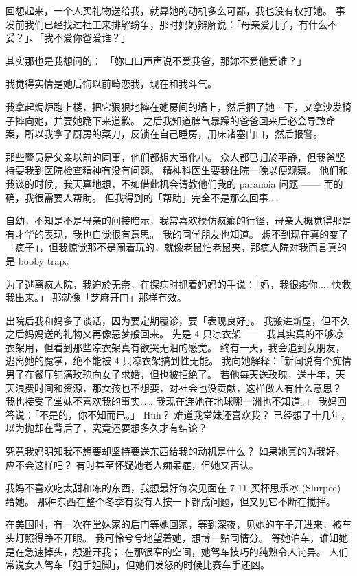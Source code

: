 \documentclass[12pt]{report}
\begin{document}
回想起来，一个人买礼物送给我，就算她的动机多么可鄙，我也没有权打她。 事发前我们已经找过社工来排解纷争，那时妈妈辩解说：「母亲爱儿子，有什么不妥？」、「我不爱你爸爱谁？」

其实那也是我想问的： 「妳口口声声说不爱我爸，那妳不爱他爱谁？」

我觉得实情是她后悔以前畸恋我，现在和我斗气。

我拿起焗炉跑上楼，把它狠狠地摔在她房间的墙上，然后掴了她一下，又拿沙发椅子摔向她，并要她跪下来道歉。 之后我知道脾气暴躁的爸爸回来后必会导致命案，所以我拿了厨房的菜刀，反锁在自己睡房，用床诸塞门口，然后报警。

那些警员是父亲以前的同事，他们都想大事化小。 众人都已归於平静，但我爸坚持要我到医院检查精神有没有问题。 精神科医生要我住院一晚以便观察。 他们和我谈的时候，我天真地想，不如借此机会请教他们我的 paranoia 问题 —— 而的确，我很需要人帮助。 但我得到的「帮助」完全不是那么回事....

自幼，不知是不是母亲的间接暗示，我常喜欢模仿疯癫的行径，母亲大概觉得那是有才华的表现，我也自觉很有意思。 我的同学朋友也知道。 想不到现在真的变了「疯子」，但我惊觉那不是闹着玩的，就像老鼠怕老鼠夹，那疯人院对我而言真的是 booby trap。

为了逃离疯人院，我迫於无奈，在探病时抓着妈妈的手说：「妈，我很疼你.... 快救我出来。」 那就像「芝麻开门」那样有效。

出院后我和妈多了谈话，因为要定期覆诊，要「表现良好」。 我搬进新屋，但不久之后妈妈送的礼物又再像恶梦般回来。 先是 4 只凉衣架 —— 我其实真的不够凉衣架用，但看到那些凉衣架真有欲哭无泪的感觉。 终有一天，我会追到女朋友，逃离她的魔掌，绝不能被 4 只凉衣架搞到性无能。 我向她解释：「新闻说有个痴情男子在餐厅铺满玫瑰向女子求婚，但也被拒绝了。 若他每天送玫瑰，送十年，天天浪费时间和资源，那女孩也不想要，对社会也没贡献，这样做人有什么意思？ 我也接受了堂妹不喜欢我的事实…… 我现在连她在地球哪一洲也不知道。」 我妈回答说：「不是的，你不知而已。」 Huh？ 难道我堂妹还喜欢我？ 已经想了十几年，以为抛却在背后了，究竟还要想多久才有结论？

究竟我妈明知我不想要却坚持要送东西给我的动机是什么？ 如果她真的为我好，应不会这样吧？ 有时甚至怀疑她老人痴呆症，但她又否认。

我妈不喜欢吃太甜和冻的东西，我想最好每次见面在 7-11 买杯思乐冰 (Slurpee) 给她。 那种东西在整个冬季有没有人按一下都成问题，但又见它不断在搅拌。

在\uline{美国}时，有一次在堂妹家的后门等她回家，等到深夜，见她的车子开进来，被车头灯照得睁不开眼。 我可怜兮兮地望着她，想博一點同情分。 等她泊车，谁知她是在急速掉头，想避开我； 在那很窄的空间，她驾车技巧的纯熟令人诧异。 人们常说女人驾车「姐手姐脚」，但她们发怒的时候比赛车手还凶。
\end{document}
